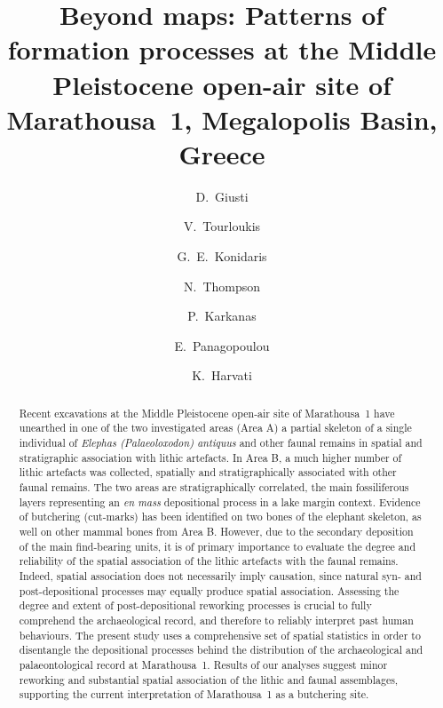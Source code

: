 \documentclass[preprint,authoryear,times]{elsarticle} %
\begin{document}
\begin{frontmatter}
  
  \title{Beyond maps: Patterns of formation processes at the Middle Pleistocene open-air site of Marathousa~1, Megalopolis Basin, Greece}
  
  \author[tue]{D.~Giusti}
  
  \author[tue]{V.~Tourloukis}
  \author[tue]{G.~E.~Konidaris}
  \author[tue]{N.~Thompson}
  \author[wiener]{P.~Karkanas}
  \author[ephoreia]{E.~Panagopoulou}
  \author[tue]{K.~Harvati}
  
  \address[tue]{Paläoanthropologie, Senckenberg Centre for Human Evolution and Palaeoenvironment, Eberhard Karls Universität Tübingen, Rümelinstr. 23, 72070 Tübingen, Germany}
  \address[erlangen]{Friedrich-Alexander University of Erlangen-Nürnberg, Institute of Prehistory and Early History, Kochstr. 4/18, 90154 Erlangen, Germany}
  \address[wiener]{Malcolm H. Wiener Laboratory for Archaeological Science, American School of Classical Studies at Athens, Greece}
  \address[ephoreia]{Ephoreia of Palaeoanthropology-Speleology of Greece, Athens, Greece}

  \begin{abstract}
    Recent excavations at the Middle Pleistocene open-air site of Marathousa~1 have unearthed in one of the two investigated areas (Area A) a partial skeleton of a single individual of \emph{Elephas (Palaeoloxodon) antiquus} and other faunal remains in spatial and stratigraphic association with lithic artefacts. In Area B, a much higher number of lithic artefacts was collected, spatially and stratigraphically associated with other faunal remains. The two areas are stratigraphically correlated, the main fossiliferous layers representing an \emph{en mass} depositional process in a lake margin context. Evidence of butchering (cut-marks) has been identified on two bones of the elephant skeleton, as well on other mammal bones from Area B. However, due to the secondary deposition of the main find-bearing units, it is of primary importance to evaluate the degree and reliability of the spatial association of the lithic artefacts with the faunal remains. Indeed, spatial association does not necessarily imply causation, since natural syn- and post-depositional processes may equally produce spatial association. Assessing the degree and extent of post-depositional reworking processes is crucial to fully comprehend the archaeological record, and therefore to reliably interpret past human behaviours. The present study uses a comprehensive set of spatial statistics in order to disentangle the depositional processes behind the distribution of the archaeological and palaeontological record at Marathousa~1. Results of our analyses suggest minor reworking and substantial spatial association of the lithic and faunal assemblages, supporting the current interpretation of Marathousa~1 as a butchering site.
  \end{abstract}


\end{frontmatter}
\end{document}
